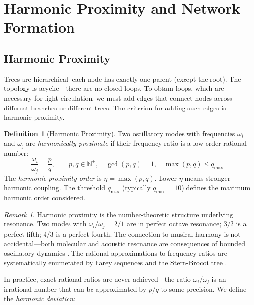 \documentclass[11pt,twocolumn,a4paper]{article}
\theoremstyle{definition}
\newtheorem{definition}[theorem]{Definition}
\theoremstyle{remark}
\newtheorem{remark}[theorem]{Remark}
\newcommand{\Natural}{\mathbb{N}}
\newcommand{\qmax}{q_{\mathrm{max}}}
\begin{document}
\section{Harmonic Proximity and Network Formation}
\label{sec:harmonic_network}

\subsection{Harmonic Proximity}

Trees are hierarchical: each node has exactly one parent (except the root). The topology is acyclic---there are no closed loops. To obtain loops, which are necessary for light circulation, we must add edges that connect nodes across different branches or different trees. The criterion for adding such edges is harmonic proximity.

\begin{definition}[Harmonic Proximity]
\label{def:harmonic_proximity}
Two oscillatory modes with frequencies $\omega_i$ and $\omega_j$ are \emph{harmonically proximate} if their frequency ratio is a low-order rational number:
\begin{equation}
\frac{\omega_i}{\omega_j} = \frac{p}{q}, \qquad p, q \in \Natural^+, \quad \gcd(p, q) = 1, \quad \max(p, q) \leq \qmax
\label{eq:harmonic_proximity}
\end{equation}
The \emph{harmonic proximity order} is $\eta = \max(p, q)$. Lower $\eta$ means stronger harmonic coupling. The threshold $\qmax$ (typically $\qmax = 10$) defines the maximum harmonic order considered.
\end{definition}

\begin{remark}
Harmonic proximity is the number-theoretic structure underlying resonance. Two modes with $\omega_i/\omega_j = 2/1$ are in perfect octave resonance; $3/2$ is a perfect fifth; $4/3$ is a perfect fourth. The connection to musical harmony is not accidental---both molecular and acoustic resonance are consequences of bounded oscillatory dynamics \citep{strogatz2015}. The rational approximations to frequency ratios are systematically enumerated by Farey sequences and the Stern-Brocot tree \citep{hardy1979}.
\end{remark}

In practice, exact rational ratios are never achieved---the ratio $\omega_i/\omega_j$ is an irrational number that can be approximated by $p/q$ to some precision. We define the \emph{harmonic deviation}:
\end{document}
